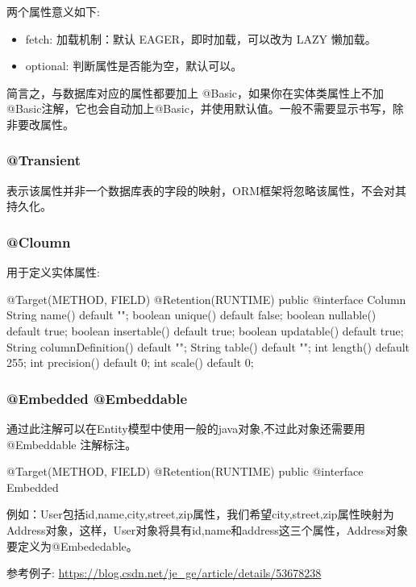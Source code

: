 两个属性意义如下:
\begin{itemize}
    \item fetch: 加载机制：默认 EAGER，即时加载，可以改为 LAZY 懒加载。
    \item optional: 判断属性是否能为空，默认可以。
\end{itemize}


简言之，与数据库对应的属性都要加上 @Basic，如果你在实体类属性上不加@Basic注解，它也会自动加上@Basic，并使用默认值。一般不需要显示书写，除非要改属性。

\subsubsection{@Transient}

表示该属性并非一个数据库表的字段的映射，ORM框架将忽略该属性，不会对其持久化。

\subsubsection{@Cloumn}

用于定义实体属性:

\begin{Java}
@Target({METHOD, FIELD}) 
@Retention(RUNTIME)
public @interface Column {
    String name() default "";
    boolean unique() default false;
    boolean nullable() default true;
    boolean insertable() default true;
    boolean updatable() default true;
    String columnDefinition() default "";
    String table() default "";
    int length() default 255;
    int precision() default 0;
    int scale() default 0;
}
\end{Java}

\subsubsection{@Embedded @Embeddable}

通过此注解可以在Entity模型中使用一般的java对象,不过此对象还需要用 @Embeddable 注解标注。

\begin{Java}
@Target({METHOD, FIELD})
@Retention(RUNTIME)
public @interface Embedded { }
\end{Java}

例如：User包括id,name,city,street,zip属性，我们希望city,street,zip属性映射为Address对象，这样，User对象将具有id,name和address这三个属性，Address对象要定义为@Embededable。

参考例子: \url{https://blog.csdn.net/je_ge/article/details/53678238}

